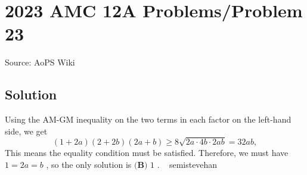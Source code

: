 \documentclass[12pt]{article}
\begin{document}
\section*{{2023 AMC 12A Problems/Problem 23}}
Source: AoPS Wiki

\subsection*{Solution}
Using the AM-GM inequality on the two terms in each factor on the left-hand side, we get \[(1+2a)(2+2b)(2a+b) \ge 8\sqrt{2a \cdot 4b \cdot 2ab}= 32ab,\] This means the equality condition must be satisfied. Therefore, we must have $1 = 2a = b$ , so the only solution is $\boxed{\textbf{(B) }1}$ . ~ semistevehan
\end{document}
